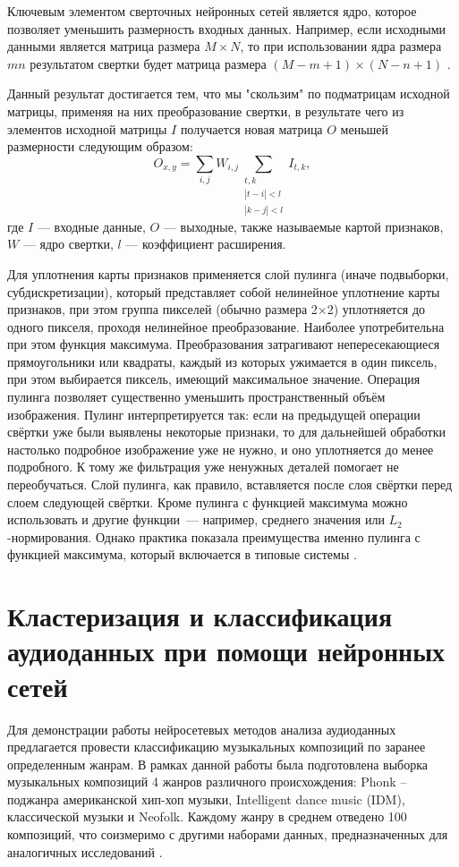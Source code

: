 Ключевым элементом сверточных нейронных сетей является ядро, которое позволяет уменьшить размерность входных данных.
Например, если исходными данными является матрица размера $M\times N$, то при использовании ядра размера $mn$ результатом свертки будет
матрица размера $(M-m+1)\times(N-n+1)$ \cite{cyberbred}.

Данный результат достигается тем, что мы "скользим" по подматрицам исходной матрицы, применяя на них преобразование свертки,
в результате чего из элементов исходной матрицы $I$ получается новая матрица $O$ меньшей размерности следующим образом:
\begin{equation}
	O_{x,y} = \sum_{i,j} W_{i,j} \sum_{\substack{t,k\\\left|t-i\right|<l\\ \left|k-j\right|<l} } I_{t,k},
\end{equation}
где 
$I$ — входные данные, $O$ — выходные, также называемые картой признаков, $W$ — ядро свертки, $l$ — коэффициент расширения. 

Для уплотнения карты признаков применяется слой пулинга (иначе подвыборки, субдискретизации), который представляет собой нелинейное уплотнение карты признаков, при этом группа пикселей (обычно размера 2×2) уплотняется до одного пикселя, проходя нелинейное преобразование. Наиболее употребительна при этом функция максимума. Преобразования затрагивают непересекающиеся прямоугольники или квадраты, каждый из которых ужимается в один пиксель, при этом выбирается пиксель, имеющий максимальное значение. Операция пулинга позволяет существенно уменьшить пространственный объём изображения. Пулинг интерпретируется так: если на предыдущей операции свёртки уже были выявлены некоторые признаки, то для дальнейшей обработки настолько подробное изображение уже не нужно, и оно уплотняется до менее подробного. К тому же фильтрация уже ненужных деталей помогает не переобучаться. Слой пулинга, как правило, вставляется после слоя свёртки перед слоем следующей свёртки.
Кроме пулинга с функцией максимума можно использовать и другие функции — например, среднего значения или $L_2$-нормирования. Однако практика показала преимущества именно пулинга с функцией максимума, который включается в типовые системы \cite{wikiconv}. 

\chapter{Кластеризация и классификация аудиоданных при помощи нейронных сетей}
Для демонстрации работы нейросетевых методов анализа аудиоданных предлагается провести классификацию музыкальных композиций
по заранее определенным жанрам. В рамках данной работы была подготовлена выборка музыкальных композиций 4 жанров различного происхождения:
Phonk -- поджанра американской хип-хоп музыки, Intelligent dance music (IDM), классической музыки и Neofolk. Каждому жанру в среднем отведено 100 композиций, что соизмеримо с другими наборами данных, предназначенных для аналогичных исследований \cite{gtzan}.

